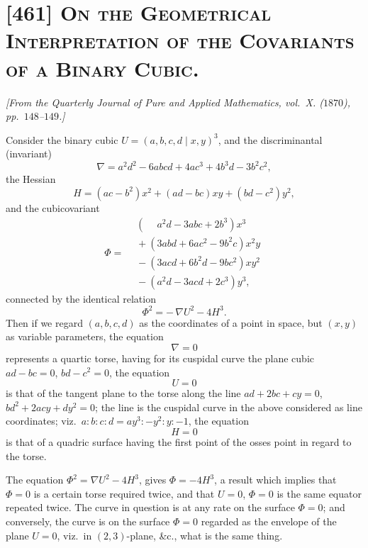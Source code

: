 \documentclass[11pt,a4paper]{article}
\providecommand{\midbar}{\mid}
\begin{document}
\section*{[461] \textsc{On the Geometrical Interpretation of the
Covariants of a Binary Cubic.}}

\begin{center}
\textit{[From the Quarterly Journal of Pure and Applied Mathematics,
vol.\ X. ($1870$), pp.\ $148$--$149$.]}
\end{center}

\medskip

Consider the binary cubic $U = (a, b, c, d\!\midbar\! x, y)^{3}$, and the
discriminantal (invariant)
\[
\nabla = a^{2} d^{2} - 6 a b c d + 4 a c^{3} + 4 b^{3} d - 3 b^{2} c^{2},
\]
the Hessian
\[
H = (a c - b^{2}) x^{2} + (a d - b c) x y + (b d - c^{2}) y^{2},
\]
and the cubicovariant
\[
\Phi = \begin{aligned}
&(\phantom{-}a^{2} d - 3 a b c + 2 b^{3}) x^{3}\\
&{}+ (3 a b d + 6 a c^{2} - 9 b^{2} c) x^{2} y\\
&{}- (3 a c d + 6 b^{2} d - 9 b c^{2}) x y^{2}\\
&{}- (a^{2} d - 3 a c d + 2 c^{3}) y^{3},
\end{aligned}
\]
connected by the identical relation
\[
\Phi^{2} = -\,\nabla U^{2} - 4 H^{3}.
\]
Then if we regard $(a, b, c, d)$ as the coordinates of a point in space,
but $(x, y)$ as variable parameters, the equation
\[
\nabla = 0
\]
represents a quartic torse, having for its cuspidal curve the plane cubic
$ad - bc = 0$, $bd - c^{2} = 0$, the equation
\[
U = 0
\]
is that of the tangent plane to the torse along the line $ad + 2 b c + cy = 0$,
$b d^{2} + 2 a c y + d y^{2} = 0$; the line is the cuspidal curve in the above
considered as line coordinates; viz.\ $a : b : c : d = a y^{3} : -y^{2} : y : -1$,
the equation
\[
H = 0
\]
is that of a quadric surface having the first point of the osses point in regard to
the torse.

The equation $\Phi^{2} = \nabla U^{2} - 4 H^{3}$, gives $\Phi = -4 H^{3}$, a result
which implies that $\Phi = 0$ is a certain torse required twice, and that $U = 0$,
$\Phi = 0$ is the same equator repeated twice. The curve in question is at any
rate on the surface $\Phi = 0$; and conversely, the curve is on the surface
$\Phi = 0$ regarded as the envelope of the plane $U = 0$, viz.\ in $(2, 3)$-plane,
\&c., what is the same thing.
\end{document}
